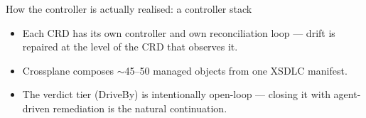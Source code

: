 \documentclass[11pt,aspectratio=169]{beamer}
\begin{document}
\begin{frame}{How the controller is actually realised: a controller stack}
\begin{center}
\end{center}

\vspace{0.1em}
\footnotesize
\begin{itemize}\setlength\itemsep{0.15em}
\item Each CRD has its own controller and own reconciliation loop ---
  drift is repaired at the level of the CRD that observes it.
\item \alert{Crossplane} composes $\sim$45--50 managed objects from one XSDLC manifest.
\item The \alert{verdict tier} (DriveBy) is intentionally open-loop ---
  closing it with agent-driven remediation is the natural continuation.
\end{itemize}

\end{frame}
\end{document}
